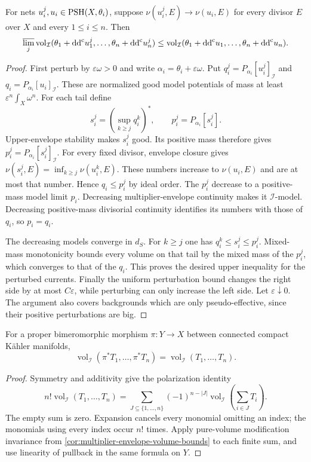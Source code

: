 \begin{theorem}\label{thm:mixed-multiplier-volume-divisorial-upper-limit}
For nets $u_i^j,u_i\in\mathrm{PSH}(X,\theta_i)$, suppose $\nu(u_i^j,E)\to\nu(u_i,E)$ for every divisor $E$ over $X$ and every $1\leq i\leq n$.
Then
\[
 \varlimsup_j\operatorname{vol}_{\mathcal I}(\theta_1+\mathrm{dd}^{\mathrm{c}} u_1^j,\ldots,\theta_n+\mathrm{dd}^{\mathrm{c}} u_n^j)
      \leq\operatorname{vol}_{\mathcal I}(\theta_1+\mathrm{dd}^{\mathrm{c}} u_1,\ldots,\theta_n+\mathrm{dd}^{\mathrm{c}} u_n).
\]
\end{theorem}
\begin{proof}
First perturb by $\varepsilon\omega>0$ and write $\alpha_i=\theta_i+\varepsilon\omega$. Put $q_i^j=P_{\alpha_i}[u_i^j]_{\mathcal I}$ and $q_i=P_{\alpha_i}[u_i]_{\mathcal I}$. These are normalized good model potentials of mass at least $\varepsilon^n\int_X\omega^n$. For each tail define
\[
 s_i^j=(\sup_{k\geq j}q_i^k)^*,\qquad p_i^j=P_{\alpha_i}[s_i^j].
\]
Upper-envelope stability makes $s_i^j$ good. Its positive mass therefore gives $p_i^j=P_{\alpha_i}[s_i^j]_{\mathcal I}$. For every fixed divisor, envelope closure gives
$\nu(s_i^j,E)=\inf_{k\geq j}\nu(u_i^k,E)$.
These numbers increase to $\nu(u_i,E)$ and are at most that number. Hence $q_i\leq p_i^j$ by ideal order. The $p_i^j$ decrease to a positive-mass model limit $p_i$. Decreasing multiplier-envelope continuity makes it $\mathcal I$-model. Decreasing positive-mass divisorial continuity identifies its numbers with those of $q_i$, so $p_i=q_i$.

The decreasing models converge in $d_S$. For $k\geq j$ one has $q_i^k\leq s_i^j\leq p_i^j$. Mixed-mass monotonicity bounds every volume on that tail by the mixed mass of the $p_i^j$, which converges to that of the $q_i$. This proves the desired upper inequality for the perturbed currents. Finally the uniform perturbation bound changes the right side by at most $C\varepsilon$, while perturbing can only increase the left side. Let $\varepsilon\downarrow0$. The argument also covers backgrounds which are only pseudo-effective, since their positive perturbations are big.
\end{proof}

\begin{corollary}\label{cor:mixed-multiplier-volume-modification-invariance}
For a proper bimeromorphic morphism $\pi:Y\to X$ between connected compact K\"ahler manifolds,
\[
 \operatorname{vol}_{\mathcal I}(\pi^*T_1,\ldots,\pi^*T_n)
                        =\operatorname{vol}_{\mathcal I}(T_1,\ldots,T_n).
\]
\end{corollary}
\begin{proof}
Symmetry and additivity give the polarization identity
\[
 n!\operatorname{vol}_{\mathcal I}(T_1,\ldots,T_n)
   =\sum_{J\subseteq\{1,\ldots,n\}}(-1)^{n-|J|}
                \operatorname{vol}_{\mathcal I}\left(\sum_{i\in J}T_i\right).
\]
The empty sum is zero. Expansion cancels every monomial omitting an index; the monomials using every index occur $n!$ times. Apply pure-volume modification invariance from \cref{cor:multiplier-envelope-volume-bounds} to each finite sum, and use linearity of pullback in the same formula on $Y$.
\end{proof}

